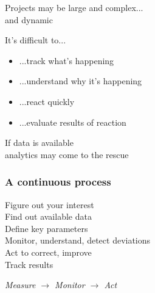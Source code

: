 \documentclass[17pt,aspectratio=169,hyperref=pdfusetitle]{beamer}
\begin{document}

\begin{frame}
\begin{flushright}
  Projects may be large and complex... \\
  and dynamic \\
\end{flushright}

It's difficult to... \

\begin{itemize}
\item ...track what's happening
\item ...understand why it's happening
\item ...react quickly
\item ...evaluate results of reaction 
\end{itemize}

\vspace{.2cm}

\begin{flushright}
If data is available\\
analytics may come to the rescue\\
\end{flushright}

\end{frame}


\begin{frame}
\frametitle{A continuous process}

Figure out your interest \\
Find out available data \\
Define key parameters \\
Monitor, understand, detect deviations \\
Act to correct, improve \\
Track results \\

\begin{flushright}
{\em Measure $\rightarrow$ Monitor $\rightarrow$ Act}
\end{flushright}
\end{frame}

\end{document}
